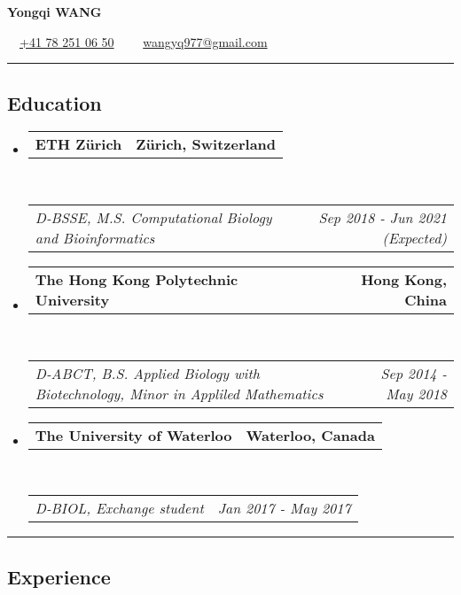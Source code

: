 \documentclass[10pt,letterpaper]{article}
\makeatletter
\newcommand{\headerrow}[2]
{\begin{tabular*}{\linewidth}{l@{\extracolsep{\fill}}r}
	#1 &
	#2 \\
\end{tabular*}}
\makeatother
\begin{document}

\begin{center}
{\LARGE \textbf{Yongqi WANG}}

\textbullet \ \ \href{tel:410782510650}{+41 78 251 06 50} \ \
\textbullet \ \ \href{mailto:wangyq977@gmail.com}{wangyq977@gmail.com}
\end{center}



\hrule
\vspace{-1em}
\subsection*{Education}

\begin{itemize}
	\parskip=0.1em

	\item
	\headerrow
		{\textbf{ETH Zürich}}
		{\textbf{Zürich, Switzerland}}
	\\
	\headerrow
		{\emph{D-BSSE, M.S. Computational Biology and Bioinformatics}}
		{\emph{Sep 2018 - Jun 2021 (Expected)}}

	\item
	\headerrow
		{\textbf{The Hong Kong Polytechnic University}}
		{\textbf{Hong Kong, China}}
	\\
	\headerrow
		{\emph{D-ABCT, B.S. Applied Biology with Biotechnology, Minor in Appliled Mathematics}}
		{\emph{Sep 2014 - May 2018}}

	\item
	\headerrow
		{\textbf{The University of Waterloo}}
		{\textbf{Waterloo, Canada}}
	\\
	\headerrow
		{\emph{D-BIOL, Exchange student}}
		{\emph{Jan 2017 - May 2017}}

\end{itemize}



\hrule
\vspace{-1em}
\subsection*{Experience}
\end{document}
